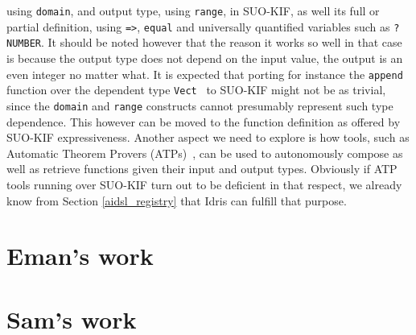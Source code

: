 \documentclass[]{report}
\begin{document}
\begin{itemize}
using \texttt{domain}, and output type, using \texttt{range}, in
SUO-KIF, as well its full or partial definition, using \texttt{=>},
\texttt{equal} and universally quantified variables such as
\texttt{?NUMBER}.  It should be noted however that the reason it works
so well in that case is because the output type does not depend on the
input value, the output is an even integer no matter what.  It is
expected that porting for instance the \texttt{append} function over
the dependent type \texttt{Vect}~\cite{Vectors} to SUO-KIF might not
be as trivial, since the \texttt{domain} and \texttt{range} constructs
cannot presumably represent such type dependence.  This however can be
moved to the function definition as offered by SUO-KIF expressiveness.
Another aspect we need to explore is how tools, such as Automatic
Theorem Provers (ATPs)~\cite{Baumgartner_automatedreasoning,
  Urban_anoverview, Alvez_evaluating_atp_adimen_SUMO}, can be used to
autonomously compose as well as retrieve functions given their input
and output types.  Obviously if ATP tools running over SUO-KIF turn
out to be deficient in that respect, we already know from Section
\ref{aidsl_registry} that Idris can fulfill that purpose.
\end{itemize}


\chapter{Eman's work}

\chapter{Sam's work}



\end{document}
